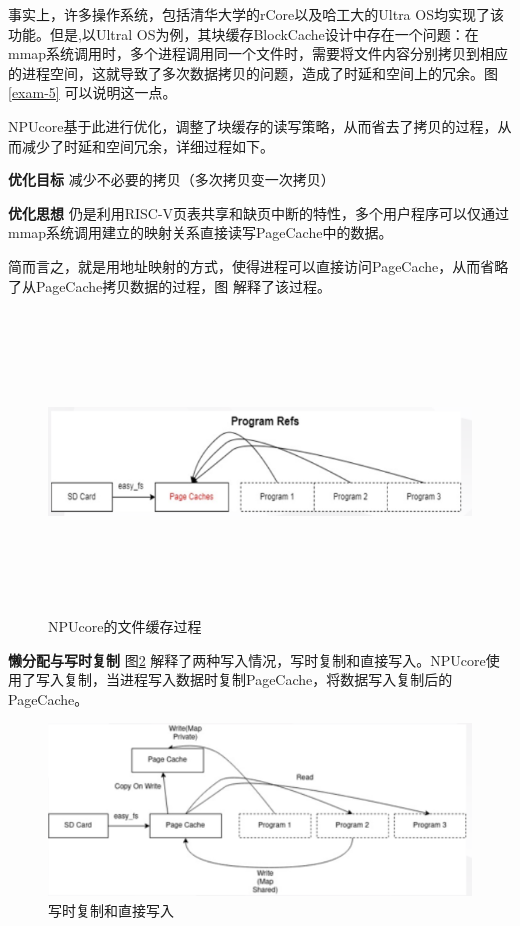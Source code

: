 事实上，许多操作系统，包括清华大学的rCore以及哈工大的Ultra OS均实现了该功能。但是,以Ultral OS为例，其块缓存BlockCache设计中存在一个问题：在mmap系统调用时，多个进程调用同一个文件时，需要将文件内容分别拷贝到相应的进程空间，这就导致了多次数据拷贝的问题，造成了时延和空间上的冗余。图\ref{exam-5} 可以说明这一点。

NPUcore基于此进行优化，调整了块缓存的读写策略，从而省去了拷贝的过程，从而减少了时延和空间冗余，详细过程如下。

\textbf{优化目标} \; 减少不必要的拷贝（多次拷贝变一次拷贝）

\textbf{优化思想} \; 仍是利用RISC-V页表共享和缺页中断的特性，多个用户程序可以仅通过mmap系统调用建立的映射关系直接读写PageCache中的数据。

简而言之，就是用地址映射的方式，使得进程可以直接访问PageCache，从而省略了从PageCache拷贝数据的过程，图 解释了该过程。

\begin{figure}[htbp]
	\centering
	\includegraphics[height=8cm]{figures/10-04/10-04-NPUcore的文件缓存过程.png}
	\caption{NPUcore的文件缓存过程}
	\label{exam-6}
\end{figure}

\textbf{懒分配与写时复制}\; 图\ref{exam-7} 解释了两种写入情况，写时复制和直接写入。NPUcore使用了写入复制，当进程写入数据时复制PageCache，将数据写入复制后的PageCache。

\begin{figure}[htbp]
	\centering
	\includegraphics[scale=0.6]{figures/10-04/10-04-写时复制和直接写入.png}
	\caption{写时复制和直接写入}
	\label{exam-7}
\end{figure}

